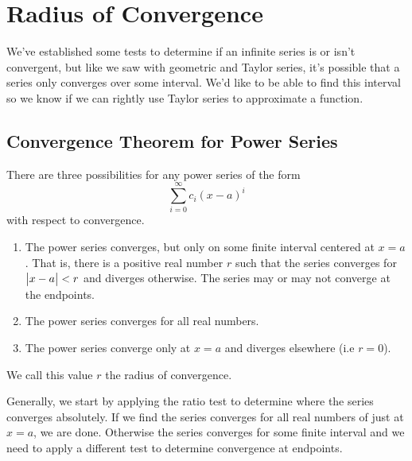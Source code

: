 \section{Radius of Convergence}
We've established some tests to determine if an infinite series is or isn't convergent, but like we saw with geometric and Taylor series, it's possible that a series only converges over some interval.
We'd like to be able to find this interval so we know if we can rightly use Taylor series to approximate a function.

\subsection{Convergence Theorem for Power Series}
\begin{theorem}
	There are three possibilities for any power series of the form
	\begin{equation*}
		\sum_{i=0}^{\infty}{c_i(x-a)^i}
	\end{equation*}
	with respect to convergence.
	\begin{enumerate}
		\item The power series converges, but only on some finite interval centered at $x=a$.
			That is, there is a positive real number $r$ such that the series converges for $\big\lvert x-a \big\rvert<r$ and diverges otherwise.
			The series may or may not converge at the endpoints.
		\item The power series converges for all real numbers.
		\item The power series converge only at $x=a$ and diverges elsewhere (i.e $r=0$).
	\end{enumerate}
	We call this value $r$ the radius of convergence.
\end{theorem}

\noindent
Generally, we start by applying the ratio test to determine where the series converges absolutely.
If we find the series converges for all real numbers of just at $x=a$, we are done.
Otherwise the series converges for some finite interval and we need to apply a different test to determine convergence at endpoints.

